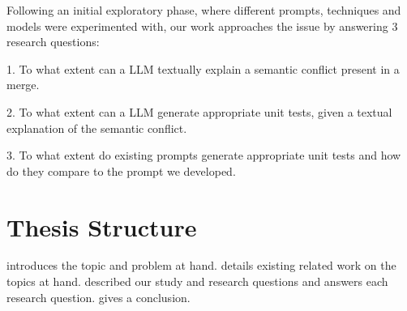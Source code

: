 Following an initial exploratory phase, where different prompts, techniques and models were experimented with, our work approaches the issue by answering
3 research questions:

1. To what extent can a LLM textually explain a semantic conflict present in a merge.

2. To what extent can a LLM generate appropriate unit tests, given a textual explanation of the semantic conflict. 

3. To what extent do existing prompts generate appropriate unit tests and how do they compare to the prompt we developed. 

\section{Thesis Structure} \label{sec:struct}


 introduces the topic and problem at hand.
 details existing related work on the topics at hand.
 described our study and research questions and  answers each research question.
 gives a conclusion.
